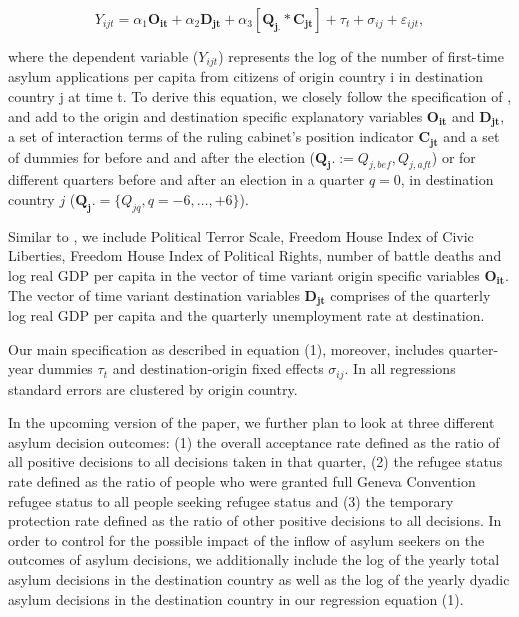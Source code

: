 \documentclass[a4paper,12pt]{article}
\begin{document}
\begin{equation}
Y_{ijt} =\alpha_1 \mathbf{O_{it}} + \alpha_2 \mathbf{D_{jt}} + \alpha_3 [\mathbf{Q_{j.}} *  \mathbf{C_{jt}}] + \tau_t + \sigma_{ij} +  \varepsilon_{ijt},
\end{equation}

where the dependent variable ($Y_{ijt}$) represents the log of the number of first-time asylum applications per capita from citizens of origin country i in destination country j at time t. To derive this equation, we closely follow the specification of \cite{hatton2016}, and add to the origin and destination specific explanatory variables $\mathbf{O_{it}}$ and $\mathbf{D_{jt}}$, a set of interaction terms of the ruling cabinet's position indicator $\mathbf{C_{jt}}$
 and  a set of dummies for before and and after the election ($\mathbf{Q_j.} := Q_{j,bef},  Q_{j,aft}$) or for different quarters before and after an election in a quarter $q=0$, in destination country $j$ ($\mathbf{Q_j.} =\{Q_{jq}, q = -6, \ldots, +6\}$).
 
  Similar to \cite{hatton2016}, we include Political Terror Scale, Freedom House Index of Civic Liberties, Freedom House Index of  Political Rights, number of battle deaths and log real GDP per capita in the vector of time variant origin specific variables $\mathbf{O_{it}}$. The vector of time variant destination variables $\mathbf{D_{jt}}$ comprises of the quarterly log real GDP per capita and the quarterly unemployment rate at destination. 
  
 Our main specification as described in equation (1), moreover, includes quarter-year dummies $\tau_t$ and destination-origin fixed effects $\sigma_{ij}$. In all regressions standard errors are clustered by origin country.
 
 In the upcoming version of the paper, we further plan to look at three different asylum decision outcomes: (1) the overall acceptance rate defined as the ratio of all positive decisions to all decisions taken in that quarter, (2) the refugee status rate defined as the ratio of people who were granted full Geneva Convention refugee status to all people seeking refugee status and (3) the temporary protection rate defined as the ratio of other positive decisions to all decisions.  In order to control for the possible impact of the inflow of asylum seekers on the outcomes of asylum decisions, we additionally include  the log of the yearly total asylum decisions in the destination country as well as the log of  the yearly dyadic asylum decisions in the destination country in our regression equation (1). 
\end{document}
